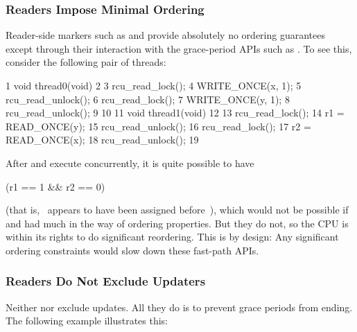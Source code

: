 \subsubsection{Readers Impose Minimal Ordering}

Reader-side markers such as  and
 provide absolutely no ordering guarantees except
through their interaction with the grace-period APIs such as
.
To see this, consider the following pair of
threads:

\begin{VerbatimN}
       1 void thread0(void)
       2 {
       3   rcu_read_lock();
       4   WRITE_ONCE(x, 1);
       5   rcu_read_unlock();
       6   rcu_read_lock();
       7   WRITE_ONCE(y, 1);
       8   rcu_read_unlock();
       9 }
      10
      11 void thread1(void)
      12 {
      13   rcu_read_lock();
      14   r1 = READ_ONCE(y);
      15   rcu_read_unlock();
      16   rcu_read_lock();
      17   r2 = READ_ONCE(x);
      18   rcu_read_unlock();
      19 }
\end{VerbatimN}

After  and  execute concurrently, it is quite
possible to have

\begin{VerbatimU}
      (r1 == 1 && r2 == 0)
\end{VerbatimU}

\noindent%
(that is, ~appears to have been assigned before~), which would
not be possible if  and  had
much in the way of ordering properties.
But they do not, so the CPU is
within its rights to do significant reordering.
This is by design:
Any
significant ordering constraints would slow down these fast-path APIs.

\QuickQuizEnd


\subsubsection{Readers Do Not Exclude Updaters}

Neither  nor  exclude updates.
All they do is to prevent grace periods from ending. The following
example illustrates this:

